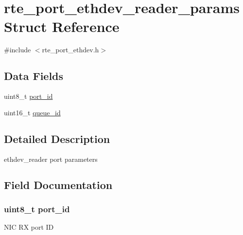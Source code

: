\hypertarget{structrte__port__ethdev__reader__params}{}\section{rte\+\_\+port\+\_\+ethdev\+\_\+reader\+\_\+params Struct Reference}
\label{structrte__port__ethdev__reader__params}


{\ttfamily \#include $<$rte\+\_\+port\+\_\+ethdev.\+h$>$}

\subsection*{Data Fields}
\begin{DoxyCompactItemize}
\item 
uint8\+\_\+t \hyperlink{structrte__port__ethdev__reader__params_aae6814cc8987b1899b9d94cb621857c3}{port\+\_\+id}
\item 
uint16\+\_\+t \hyperlink{structrte__port__ethdev__reader__params_ad36dd41501a26e3cc7590d1d9a62cdb9}{queue\+\_\+id}
\end{DoxyCompactItemize}


\subsection{Detailed Description}
ethdev\+\_\+reader port parameters 

\subsection{Field Documentation}
\hypertarget{structrte__port__ethdev__reader__params_aae6814cc8987b1899b9d94cb621857c3}{}
\subsubsection[{port\+\_\+id}]{\setlength{\rightskip}{0pt plus 5cm}uint8\+\_\+t port\+\_\+id}\label{structrte__port__ethdev__reader__params_aae6814cc8987b1899b9d94cb621857c3}
N\+I\+C R\+X port I\+D \hypertarget{structrte__port__ethdev__reader__params_ad36dd41501a26e3cc7590d1d9a62cdb9}{}
